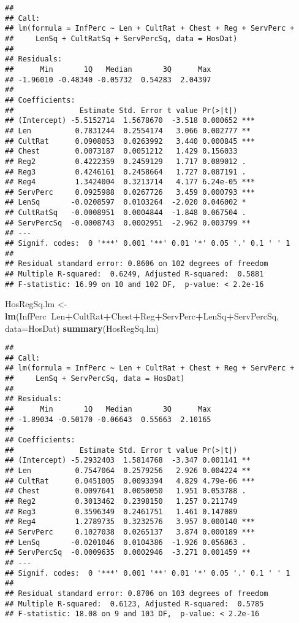 \documentclass[]{article}
\newenvironment{Shaded}{\begin{snugshade}}{\end{snugshade}}
\newcommand{\KeywordTok}[1]{\textcolor[rgb]{0.13,0.29,0.53}{\textbf{#1}}}
\newcommand{\DataTypeTok}[1]{\textcolor[rgb]{0.13,0.29,0.53}{#1}}
\newcommand{\StringTok}[1]{\textcolor[rgb]{0.31,0.60,0.02}{#1}}
\newcommand{\OperatorTok}[1]{\textcolor[rgb]{0.81,0.36,0.00}{\textbf{#1}}}
\newcommand{\NormalTok}[1]{#1}
\begin{document}
\begin{verbatim}
## 
## Call:
## lm(formula = InfPerc ~ Len + CultRat + Chest + Reg + ServPerc + 
##     LenSq + CultRatSq + ServPercSq, data = HosDat)
## 
## Residuals:
##      Min       1Q   Median       3Q      Max 
## -1.96010 -0.48340 -0.05732  0.54283  2.04397 
## 
## Coefficients:
##               Estimate Std. Error t value Pr(>|t|)    
## (Intercept) -5.5152714  1.5678670  -3.518 0.000652 ***
## Len          0.7831244  0.2554174   3.066 0.002777 ** 
## CultRat      0.0908053  0.0263992   3.440 0.000845 ***
## Chest        0.0073187  0.0051212   1.429 0.156033    
## Reg2         0.4222359  0.2459129   1.717 0.089012 .  
## Reg3         0.4246161  0.2458664   1.727 0.087191 .  
## Reg4         1.3424004  0.3213714   4.177 6.24e-05 ***
## ServPerc     0.0925988  0.0267726   3.459 0.000793 ***
## LenSq       -0.0208597  0.0103264  -2.020 0.046002 *  
## CultRatSq   -0.0008951  0.0004844  -1.848 0.067504 .  
## ServPercSq  -0.0008743  0.0002951  -2.962 0.003799 ** 
## ---
## Signif. codes:  0 '***' 0.001 '**' 0.01 '*' 0.05 '.' 0.1 ' ' 1
## 
## Residual standard error: 0.8606 on 102 degrees of freedom
## Multiple R-squared:  0.6249, Adjusted R-squared:  0.5881 
## F-statistic: 16.99 on 10 and 102 DF,  p-value: < 2.2e-16
\end{verbatim}

\begin{Shaded}
\begin{Highlighting}[]
\NormalTok{HosRegSq.lm <-}\StringTok{ }\KeywordTok{lm}\NormalTok{(InfPerc}\OperatorTok{~}\NormalTok{Len}\OperatorTok{+}\NormalTok{CultRat}\OperatorTok{+}\NormalTok{Chest}\OperatorTok{+}\NormalTok{Reg}\OperatorTok{+}\NormalTok{ServPerc}\OperatorTok{+}\NormalTok{LenSq}\OperatorTok{+}\NormalTok{ServPercSq, }\DataTypeTok{data=}\NormalTok{HosDat)}
\KeywordTok{summary}\NormalTok{(HosRegSq.lm)}
\end{Highlighting}
\end{Shaded}

\begin{verbatim}
## 
## Call:
## lm(formula = InfPerc ~ Len + CultRat + Chest + Reg + ServPerc + 
##     LenSq + ServPercSq, data = HosDat)
## 
## Residuals:
##      Min       1Q   Median       3Q      Max 
## -1.89034 -0.50170 -0.06643  0.55663  2.10165 
## 
## Coefficients:
##               Estimate Std. Error t value Pr(>|t|)    
## (Intercept) -5.2932403  1.5814768  -3.347 0.001141 ** 
## Len          0.7547064  0.2579256   2.926 0.004224 ** 
## CultRat      0.0451005  0.0093394   4.829 4.79e-06 ***
## Chest        0.0097641  0.0050050   1.951 0.053788 .  
## Reg2         0.3013462  0.2398150   1.257 0.211749    
## Reg3         0.3596349  0.2461751   1.461 0.147089    
## Reg4         1.2789735  0.3232576   3.957 0.000140 ***
## ServPerc     0.1027038  0.0265137   3.874 0.000189 ***
## LenSq       -0.0201046  0.0104386  -1.926 0.056863 .  
## ServPercSq  -0.0009635  0.0002946  -3.271 0.001459 ** 
## ---
## Signif. codes:  0 '***' 0.001 '**' 0.01 '*' 0.05 '.' 0.1 ' ' 1
## 
## Residual standard error: 0.8706 on 103 degrees of freedom
## Multiple R-squared:  0.6123, Adjusted R-squared:  0.5785 
## F-statistic: 18.08 on 9 and 103 DF,  p-value: < 2.2e-16
\end{verbatim}
\end{document}
